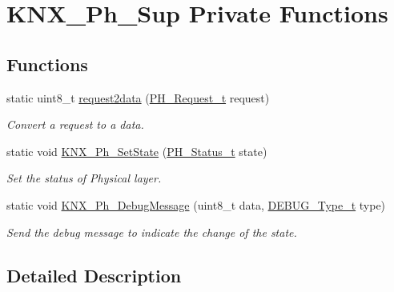\hypertarget{group___k_n_x___p_h___sup___private___functions}{}\section{K\+N\+X\+\_\+\+Ph\+\_\+\+Sup Private Functions}
\label{group___k_n_x___p_h___sup___private___functions}
\subsection*{Functions}
\begin{DoxyCompactItemize}
\item 
static uint8\+\_\+t \hyperlink{group___k_n_x___p_h___sup___private___functions_gaa1d7c7761cb6971931395ef1fb9dfe59}{request2data} (\hyperlink{group___k_n_x___p_h___sup___exported___types_ga78f5bed722457f025cbc6786d5730d3e}{P\+H\+\_\+\+Request\+\_\+t} request)
\begin{DoxyCompactList}\small\item\em Convert a request to a data. \end{DoxyCompactList}\item 
static void \hyperlink{group___k_n_x___p_h___sup___private___functions_ga8253bed4aa2e3d7bfa9c1de3604668e0}{K\+N\+X\+\_\+\+Ph\+\_\+\+Set\+State} (\hyperlink{group___k_n_x___p_h___sup___exported___types_ga5b665a94bef912fbfbea7cc949ed0e49}{P\+H\+\_\+\+Status\+\_\+t} state)
\begin{DoxyCompactList}\small\item\em Set the status of Physical layer. \end{DoxyCompactList}\item 
static void \hyperlink{group___k_n_x___p_h___sup___private___functions_gaad432d8797e22b886ab169401decc3dd}{K\+N\+X\+\_\+\+Ph\+\_\+\+Debug\+Message} (uint8\+\_\+t data, \hyperlink{group___debug___exported___types_gacb1775677105967978fae4d9155cca26}{D\+E\+B\+U\+G\+\_\+\+Type\+\_\+t} type)
\begin{DoxyCompactList}\small\item\em Send the debug message to indicate the change of the state. \end{DoxyCompactList}\end{DoxyCompactItemize}


\subsection{Detailed Description}


